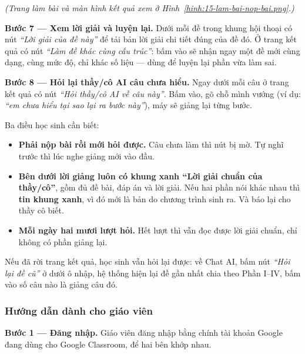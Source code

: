 \noindent\textit{(Trang làm bài và màn hình kết quả xem ở Hình~\ref{hinh:15-lam-bai-nop-bai.png}.)}

\textbf{Bước 7 --- Xem lời giải và luyện lại.} Dưới mỗi đề trong khung hội
thoại có nút \textit{``Lời giải của đề này''} để tải bản lời giải chi tiết đúng
của đề đó. Ở trang kết quả có nút \textit{``Làm đề khác cùng cấu trúc''}: bấm
vào sẽ nhận ngay một đề mới cùng dạng, cùng mức độ, chỉ khác số liệu --- dùng
để luyện lại phần vừa làm sai.


\textbf{Bước 8 --- Hỏi lại thầy/cô AI câu chưa hiểu.} Ngay dưới mỗi câu ở trang
kết quả có nút \textit{``Hỏi thầy/cô AI về câu này''}. Bấm vào, gõ chỗ mình
vướng (ví dụ: \textit{``em chưa hiểu tại sao lại ra bước này''}), máy sẽ giảng
lại từng bước.

Ba điều học sinh cần biết:

\begin{itemize}[leftmargin=1.2cm, itemsep=2pt]
  \item \textbf{Phải nộp bài rồi mới hỏi được.} Câu chưa làm thì nút bị mờ.
        Tự nghĩ trước thì lúc nghe giảng mới vào đầu.
  \item \textbf{Bên dưới lời giảng luôn có khung xanh ``Lời giải chuẩn của
        thầy/cô''}, gồm đủ đề bài, đáp án và lời giải. Nếu hai phần nói khác
        nhau thì \textbf{tin khung xanh}, vì đó mới là bản do chương trình sinh
        ra. Và báo lại cho thầy cô biết.
  \item \textbf{Mỗi ngày hai mươi lượt hỏi.} Hết lượt thì vẫn đọc được lời giải
        chuẩn, chỉ không có phần giảng lại.
\end{itemize}

Nếu đã rời trang kết quả, học sinh vẫn hỏi lại được: về Chat AI, bấm nút
\textit{``Hỏi lại đề cũ''} ở dưới ô nhập, hệ thống hiện lại đề gần nhất chia
theo Phần I--IV, bấm vào số câu nào là giảng câu đó.


\subsubsection{Hướng dẫn dành cho giáo viên}

\textbf{Bước 1 --- Đăng nhập.} Giáo viên đăng nhập bằng chính tài khoản Google
đang dùng cho Google Classroom, để hai bên khớp nhau.

